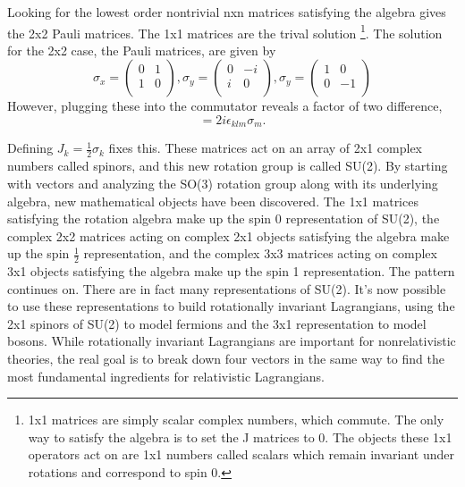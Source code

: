 Looking for the lowest order nontrivial nxn matrices satisfying the algebra gives the 2x2 Pauli matrices. The 1x1 matrices are the trival solution \footnote{1x1 matrices are simply scalar complex numbers, which commute. The only way to satisfy the algebra is to set the J matrices to 0. The objects these 1x1 operators act on are 1x1 numbers called scalars which remain invariant under rotations and correspond to spin 0.}. The solution for the 2x2 case, the Pauli matrices, are given by
\begin{equation}
\sigma_x = 
\begin{pmatrix}
0 & 1 \\
1 & 0 \\
\end{pmatrix},
\sigma_y = 
\begin{pmatrix}
0 & -i \\
i & 0 \\
\end{pmatrix},
\sigma_y = 
\begin{pmatrix}
1 & 0 \\
0 & -1 \\
\end{pmatrix}
\end{equation}
However, plugging these into the commutator reveals a factor of two difference,
\begin{equation}
[\sigma_k, \sigma_l] = 2i\epsilon_{klm}\sigma_m.
\end{equation}

Defining $J_k = \frac{1}{2} \sigma_k$ fixes this. These matrices act on an array of 2x1 complex numbers called spinors, and this new rotation group is called SU(2). By starting with vectors and analyzing the SO(3) rotation group along with its underlying algebra, new mathematical objects have been discovered. The 1x1 matrices satisfying the rotation algebra make up the spin 0 representation of SU(2), the complex 2x2 matrices acting on complex 2x1 objects satisfying the algebra make up the spin $\frac{1}{2}$ representation, and the complex 3x3 matrices acting on complex 3x1 objects satisfying the algebra make up the spin 1 representation. The pattern continues on. There are in fact many representations of SU(2). It's now possible to use these representations to build rotationally invariant Lagrangians, using the 2x1 spinors of SU(2) to model fermions and the 3x1 representation to model bosons. While rotationally invariant Lagrangians are important for nonrelativistic theories, the real goal is to break down four vectors in the same way to find the most fundamental ingredients for relativistic Lagrangians. 

